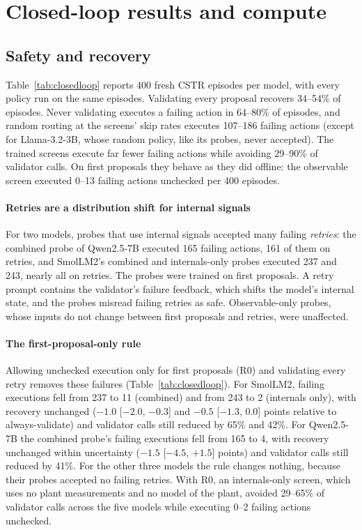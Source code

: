 \section{Closed-loop results and compute}\label{sec:closedloop}

\subsection{Safety and recovery}
Table~\ref{tab:closedloop} reports 400 fresh CSTR episodes per model, with every policy run on the same episodes.
Validating every proposal recovers 34--54\% of episodes. Never validating executes a failing action in 64--80\% of
episodes, and random routing at the screens' skip rates executes 107--186 failing actions (except for Llama-3.2-3B,
whose random policy, like its probes, never accepted). The trained screens execute far fewer failing actions while
avoiding 29--90\% of validator calls. On first proposals they behave as they did offline: the observable screen
executed 0--13 failing actions unchecked per 400 episodes.

\paragraph{Retries are a distribution shift for internal signals} For two models, probes that use internal signals
accepted many failing \emph{retries}: the combined probe of Qwen2.5-7B executed 165 failing actions, 161 of them on
retries, and SmolLM2's combined and internals-only probes executed 237 and 243, nearly all on retries. The probes were
trained on first proposals. A retry prompt contains the validator's failure feedback, which shifts the model's
internal state, and the probes misread failing retries as safe. Observable-only probes, whose inputs do not change
between first proposals and retries, were unaffected.

\paragraph{The first-proposal-only rule} Allowing unchecked execution only for first proposals (R0) and validating
every retry removes these failures (Table~\ref{tab:closedloop}). For SmolLM2, failing executions fell from 237 to 11
(combined) and from 243 to 2 (internals only), with recovery unchanged ($-1.0$ [$-2.0$, $-0.3$] and $-0.5$ [$-1.3$,
0.0] points relative to always-validate) and validator calls still reduced by 65\% and 42\%. For Qwen2.5-7B the
combined probe's failing executions fell from 165 to 4, with recovery unchanged within uncertainty
($-1.5$ [$-4.5$, $+1.5$] points) and validator calls still reduced by 41\%. For the other three
models the rule changes nothing, because their probes accepted no failing retries. With R0, an internals-only screen,
which uses no plant measurements and no model of the plant, avoided 29--65\% of validator calls across the five models
while executing 0--2 failing actions unchecked.

